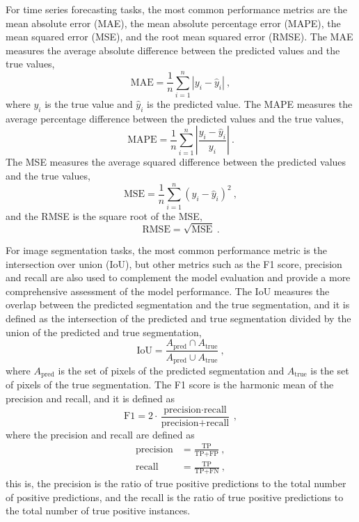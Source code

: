 For time series forecasting tasks, the most common performance metrics are the
mean absolute error (MAE), the mean absolute percentage error (MAPE), the
mean squared error (MSE), and the root mean squared error (RMSE). The MAE
measures the average absolute difference between the predicted values and the
true values,
\begin{equation}
  \text{MAE} = \frac{1}{n}\sum_{i=1}^{n}|y_i - \hat{y}_i| \ ,
\end{equation}
where $y_i$ is the true value and $\hat{y}_i$ is the predicted value. The
MAPE
measures the average percentage difference between the predicted values and
the
true values,
\begin{equation}
  \text{MAPE} = \frac{1}{n}\sum_{i=1}^{n}\left|\frac{y_i -
    \hat{y}_i}{y_i}\right| \ .
\end{equation}
The MSE measures the average squared difference between the predicted values
and the true values,
\begin{equation}
  \text{MSE} = \frac{1}{n}\sum_{i=1}^{n}(y_i - \hat{y}_i)^2 \ ,
\end{equation}
and the RMSE is the square root of the MSE,
\begin{equation}
  \text{RMSE} = \sqrt{\text{MSE}} \ .
\end{equation}

For image segmentation tasks, the most common performance metric is the
intersection over union (IoU), but other metrics such as the F1 score,
precision and recall are also used to complement the model evaluation and
provide a more comprehensive assessment of the model performance. The IoU
measures the overlap between the predicted segmentation and the true
segmentation, and it is defined as the intersection of the predicted and true
segmentation divided by the union of the predicted and true segmentation,
\begin{equation}
  \text{IoU} = \frac{A_{\text{pred}} \cap A_{\text{true}}}{A_{\text{pred}}
    \cup
    A_{\text{true}}} \ ,
\end{equation}
where $A_{\text{pred}}$ is the set of pixels of the predicted segmentation
and
$A_{\text{true}}$ is the set of pixels of the true segmentation. The F1 score
is the harmonic mean of the precision and recall, and it is defined as
\begin{equation}
  \text{F1} =
  2\cdot\frac{\text{precision}\cdot\text{recall}}{\text{precision}
    +
    \text{recall}} \ ,
\end{equation}
where the precision and recall are defined as
\begin{align}
  \text{precision} & = \frac{\text{TP}}{\text{TP} + \text{FP}} \ , \\
  \text{recall}    & = \frac{\text{TP}}{\text{TP} + \text{FN}} \ ,
\end{align}
this is, the precision is the ratio of true positive predictions to the total
number of positive predictions, and the recall is the ratio of true positive
predictions to the total number of true positive instances.

